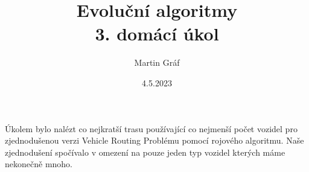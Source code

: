 \documentclass[a4paper]{article}
\begin{document}
 
 
\title{ Evoluční algoritmy \\ 3. domácí úkol
        } 
\author{Martin Gráf}
\date{4.5.2023}

\maketitle

Úkolem bylo nalézt co nejkratší trasu používající co nejmenší počet vozidel pro zjednodušenou verzi Vehicle Routing Problému pomocí rojového algoritmu. Naše zjednodušení spočívalo v omezení na pouze jeden typ vozidel kterých máme nekonečně mnoho.
\end{document}
